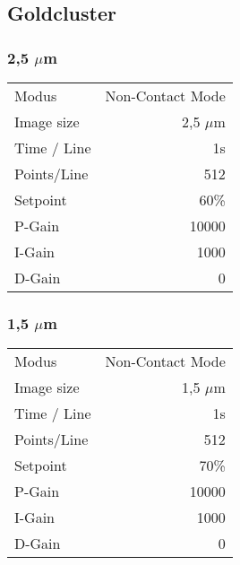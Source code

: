 \subsection{Goldcluster}

\subsubsection{2,5 $\mu$m}
\begin{center}
    \centering
    \begin{tabular}{l|r}
        Modus & Non-Contact Mode\\
        Image size & 2,5 $\mu$m \\
        Time / Line & 1s \\
        Points/Line & 512\\
        Setpoint & 60\% \\
        P-Gain & 10000 \\
        I-Gain & 1000 \\
        D-Gain & 0 \\
        
    \end{tabular}
\end{center}

\subsubsection{1,5 $\mu$m}
\begin{center}
    \centering
    \begin{tabular}{l|r}
        Modus & Non-Contact Mode\\
        Image size & 1,5 $\mu$m \\
        Time / Line & 1s \\
        Points/Line & 512\\
        Setpoint & 70\% \\
        P-Gain & 10000 \\
        I-Gain & 1000 \\
        D-Gain & 0 \\
        
    \end{tabular}
\end{center}

